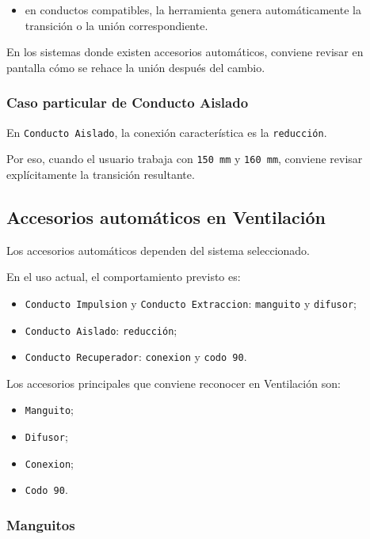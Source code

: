 \documentclass[12pt,a4paper]{article}
\begin{document}
\begin{itemize}
\item en conductos compatibles, la herramienta genera automáticamente la transición o la unión correspondiente.
\end{itemize}

En los sistemas donde existen accesorios automáticos, conviene revisar en pantalla cómo se rehace la unión después del cambio.

\subsubsection{Caso particular de Conducto Aislado}

En \texttt{Conducto Aislado}, la conexión característica es la \texttt{reducción}.

Por eso, cuando el usuario trabaja con \texttt{150 mm} y \texttt{160 mm}, conviene revisar explícitamente la transición resultante.

\subsection{Accesorios automáticos en Ventilación}

Los accesorios automáticos dependen del sistema seleccionado.

En el uso actual, el comportamiento previsto es:

\begin{itemize}
\item \texttt{Conducto Impulsion} y \texttt{Conducto Extraccion}: \texttt{manguito} y \texttt{difusor};
\item \texttt{Conducto Aislado}: \texttt{reducción};
\item \texttt{Conducto Recuperador}: \texttt{conexion} y \texttt{codo 90}.
\end{itemize}

Los accesorios principales que conviene reconocer en Ventilación son:

\begin{itemize}
\item \texttt{Manguito};
\item \texttt{Difusor};
\item \texttt{Conexion};
\item \texttt{Codo 90}.
\end{itemize}

\subsubsection{Manguitos}
\end{document}
